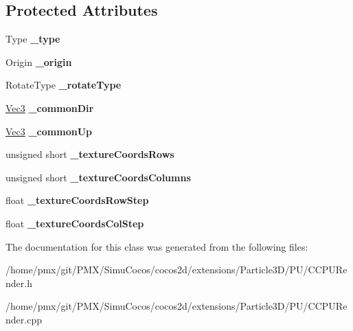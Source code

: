\subsection*{Protected Attributes}
\begin{DoxyCompactItemize}
\item 
\mbox{\label{classPUParticle3DQuadRender_afaf18a67280a7fb3ee489e133d58f427}} 
Type {\bfseries \+\_\+type}
\item 
\mbox{\label{classPUParticle3DQuadRender_a8fa5f303437cbd1884c8331bec028324}} 
Origin {\bfseries \+\_\+origin}
\item 
\mbox{\label{classPUParticle3DQuadRender_a1ac5a202f7272da591ff7dfe28082fee}} 
Rotate\+Type {\bfseries \+\_\+rotate\+Type}
\item 
\mbox{\label{classPUParticle3DQuadRender_a025ca6a1029d74f059f7d13b8a70679f}} 
\hyperlink{classVec3}{Vec3} {\bfseries \+\_\+common\+Dir}
\item 
\mbox{\label{classPUParticle3DQuadRender_a147016ecc1661ac3ee3ab59189f738a1}} 
\hyperlink{classVec3}{Vec3} {\bfseries \+\_\+common\+Up}
\item 
\mbox{\label{classPUParticle3DQuadRender_af78a04743971b1e9972e685af36bfd83}} 
unsigned short {\bfseries \+\_\+texture\+Coords\+Rows}
\item 
\mbox{\label{classPUParticle3DQuadRender_ae854c2a12d2b4a14ad622caf31656769}} 
unsigned short {\bfseries \+\_\+texture\+Coords\+Columns}
\item 
\mbox{\label{classPUParticle3DQuadRender_a027510a044d3559223149696aab485a7}} 
float {\bfseries \+\_\+texture\+Coords\+Row\+Step}
\item 
\mbox{\label{classPUParticle3DQuadRender_a2b8cfe7c7f0ae3b0fa721a0859ae4f1d}} 
float {\bfseries \+\_\+texture\+Coords\+Col\+Step}
\end{DoxyCompactItemize}


The documentation for this class was generated from the following files\+:\begin{DoxyCompactItemize}
\item 
/home/pmx/git/\+P\+M\+X/\+Simu\+Cocos/cocos2d/extensions/\+Particle3\+D/\+P\+U/C\+C\+P\+U\+Render.\+h\item 
/home/pmx/git/\+P\+M\+X/\+Simu\+Cocos/cocos2d/extensions/\+Particle3\+D/\+P\+U/C\+C\+P\+U\+Render.\+cpp\end{DoxyCompactItemize}

